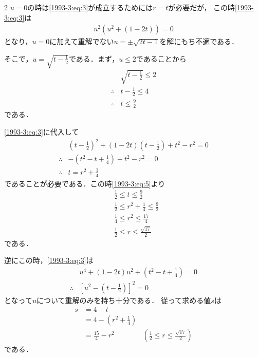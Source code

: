 \documentclass[../../../../main.tex]{subfiles}
\begin{document}
\begin{multicols}{2}
  $u=0$の時は\cref{1993-3:eq:3}が成立するためには$r=t$が必要だが，
  この時\cref{1993-3:eq:3}は
  \begin{align*}
    u^2(u^2+(1-2t))=0
  \end{align*}
  となり，$u=0$に加えて重解でない$u=\pm\sqrt{2t-1}$を解にもち不適である．

  そこで，$u=\sqrt{t-\frac{1}{2}}$である．まず，$u \le 2$であることから
  \begin{align}
     & \sqrt{t-\frac{1}{2}} \le 2          \\
    \therefore
     & t - \frac{1}{2} \le 4               \\
    \therefore
     & t \le \frac{9}{2} \label{1993-3:eq:5}
  \end{align}
  である．

  \cref{1993-3:eq:3}に代入して
  \begin{align*}
     & \left(t-\frac{1}{2}\right)^2 + (1-2t)\left(t-\frac{1}{2}\right) + t^2 - r^2 = 0 \\
    \therefore
     & -\left(t^2-t+\frac{1}{4}\right) + t^2 - r^2 = 0                                 \\
    \therefore
     & t = r^2 + \frac{1}{4}
  \end{align*}
  であることが必要である．この時\cref{1993-3:eq:5}より
  \begin{align*}
     & \frac{1}{2} \le t \le \frac{9}{2}                  \\
     & \frac{1}{2} \le  r^2 + \frac{1}{4} \le \frac{9}{2} \\
     & \frac{1}{4} \le  r^2  \le \frac{17}{4}             \\
     & \frac{1}{2} \le  r  \le \frac{\sqrt{17}}{2}
  \end{align*}
  である．

  逆にこの時，\cref{1993-3:eq:3}は
  \begin{align*}
     & u^4 + (1-2t)u^2 + \left(t^2-t + \frac{1}{4}\right) = 0 \\
    \therefore
     & \left[u^2-\left(t-\frac{1}{2}\right)\right]^2 = 0
  \end{align*}
  となって$u$について重解のみを持ち十分である．
  従って求める値$s$は
  \begin{align}
    s
     & = 4 - t                                                                                                           \\
     & = 4 - \left(r^2 + \frac{1}{4}\right)                                                                              \\
     & = \frac{15}{4} - r^2                 & \left(\frac{1}{2} \le  r  \le \frac{\sqrt{17}}{2}\right) \label{1993-3:eq:6}
  \end{align}
  である．


\end{multicols}
\end{document}
